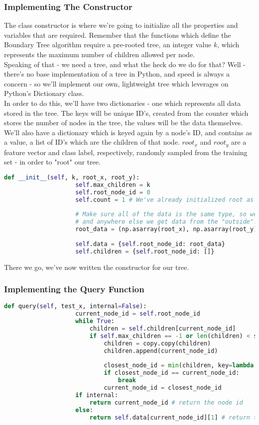 \documentclass[12pt,letterpaper]{article}
\begin{document}
			\subsubsection{Implementing The Constructor}
				The class constructor is where we're going to initialize all the properties and variables that are required. Remember that the functions which define the Boundary Tree algorithm require a pre-rooted tree, an integer value $k$, which represents the maximum number of children allowed per node.\\ Speaking of that - we need a tree, and what the heck do we do for that? Well - there's no base implementation of a tree in Python, and speed is always a concern - so we'll implement our own, lightweight tree which leverages on Python's Dictionary class.\\
				
				In order to do this, we'll have two dictionaries - one which represents all data stored in the tree. The keys will be unique ID's, created from the counter which stores the number of nodes in the tree, the values will be the data themselves. We'll also have a dictionary which is keyed again by a node's ID, and contains as a value, a list of ID's which are the children of that node. $root_x$ and $root_y$ are a feature vector and class label, respectively, randomly sampled from the training set - in order to "root" our tree.
				
				\begin{lstlisting}[language=Python]
				def __init__(self, k, root_x, root_y):
					self.max_children = k
					self.root_node_id = 0
					self.count = 1 # We've already initialized root as 0, so start with 1.
				
					# Make sure all of the data is the same type, so we'll force it - here
					# and anywhere else we get data from the "outside".
					root_data = (np.asarray(root_x), np.asarray(root_y))
				
					self.data = {self.root_node_id: root_data}
					self.children = {self.root_node_id: []}
				\end{lstlisting}
				There we go, we've now written the constructor for our tree. 
			\subsubsection{Implementing the Query Function}
				\begin{lstlisting}[language=Python]
				def query(self, test_x, internal=False):
					current_node_id = self.root_node_id
					while True:
						children = self.children[current_node_id]
						if self.max_children == -1 or len(children) < self.max_children:
							children = copy.copy(children)
							children.append(current_node_id)
							
							closest_node_id = min(children, key=lambda child_node_id: BoundaryTree.distance(self.data[child_node_id][0], test_x))
							if closest_node_id == current_node_id:
								break
							current_node_id = closest_node_id
					if internal:
						return current_node_id # return the node id
					else:
						return self.data[current_node_id][1] # return the class label itself, for convenience.
				\end{lstlisting}
				
\end{document}
